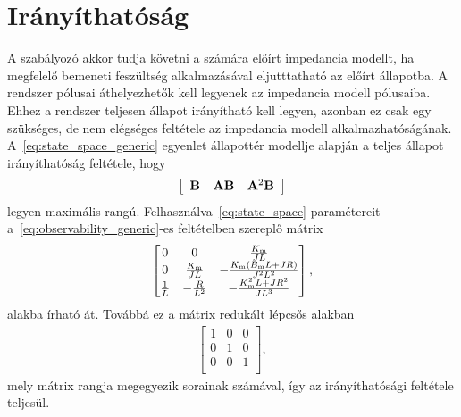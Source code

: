 \chapter{Irányíthatóság}\label{chap:controllability}
A szabályozó akkor tudja követni a számára előírt impedancia modellt, 
ha megfelelő bemeneti feszültség alkalmazásával eljutttatható az előírt állapotba. 
A rendszer pólusai áthelyezhetők kell legyenek az impedancia modell pólusaiba. Ehhez 
a rendszer teljesen állapot irányítható kell legyen, azonban ez csak egy szükséges, 
de nem elégséges feltétele az impedancia modell alkalmazhatóságának.
A~\eqref{eq:state_space_generic} egyenlet állapottér modellje alapján a teljes állapot irányíthatóság feltétele, hogy
\begin{align}\label{eq:observability_generic}
    \left[\begin{array}{c|c|c}
        \mathbf{B} & \mathbf{AB} & \mathbf{A}^2 \mathbf{B}
    \end{array}\right]
\end{align}
legyen maximális rangú. 
Felhasználva~\eqref{eq:state_space} paramétereit a~\eqref{eq:observability_generic}-es feltételben szereplő mátrix
\begin{align}
    \begin{bmatrix}
        0 & 0 & \frac{K_{\mathrm{m}}}{JL} \\
        0 & \frac{K_{\mathrm{m}}}{JL} & -\frac{K_{\mathrm{m}}\left(B_{\mathrm{m}} L + JR\right)}{J^2 L^2} \\
        \frac{1}{L} & -\frac{R}{L^2} & -\frac{K^2_{\mathrm{m}} L + JR^2}{J L^3} \\
    \end{bmatrix},
\end{align}
alakba írható át. Továbbá ez a mátrix redukált lépcsős alakban
\begin{align}
    \begin{bmatrix}
        1 & 0 & 0 \\
        0 & 1 & 0 \\
        0 & 0 & 1 \\
    \end{bmatrix},
\end{align}
mely mátrix rangja megegyezik sorainak számával, így az irányíthatósági feltétele teljesül.
